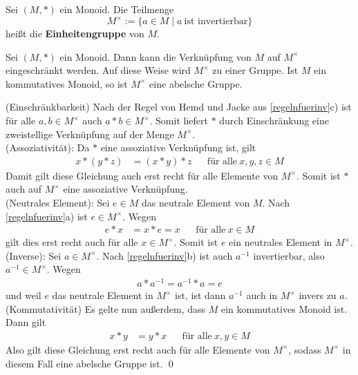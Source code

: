 \begin{de} 
    Sei $(M,*)$ ein Monoid. Die Teilmenge
        \[ M^\times := \{a\in M\mid a\ \text{ist invertierbar} \} \]
    heißt die \textbf{Einheitengruppe} von $M$.
\end{de}


\begin{satz} \label{einheitengruppe}
    Sei $(M,*)$ ein Monoid. Dann kann die Verknüpfung von $M$ auf $M^\times$ eingeschränkt werden. Auf diese Weise wird $M^\times$ zu einer Gruppe. Ist $M$ ein kommutatives Monoid, so ist $M^\times$ eine abelsche Gruppe.
\end{satz}


\begin{bew}
    (Einschränkbarkeit) Nach der Regel von Hemd und Jacke aus \cref{regelnfuerinv}c) ist für alle $a,b\in M^\times$ auch $a*b\in M^\times$. Somit liefert $*$ durch Einschränkung eine zweistellige Verknüpfung auf der Menge $M^\times$. \\[0.5em]
    (Assoziativität): Da $*$ eine assoziative Verknüpfung ist, gilt
    \begin{align*}
        x*(y*z) & = (x*y)*z && \text{für alle}\ x,y,z\in M
    \end{align*}
    Damit gilt diese Gleichung auch erst recht für alle Elemente von $M^\times$. Somit ist $*$ auch auf $M^\times$ eine assoziative Verknüpfung. \\[0.5em]
    (Neutrales Element): Sei $e\in M$ das neutrale Element von $M$. Nach \cref{regelnfuerinv}a) ist $e\in M^\times$. Wegen
    \begin{align*}
        e*x& =x*e=x && \text{für alle}\ x\in M
    \end{align*}
    gilt dies erst recht auch für alle $x\in M^\times$. Somit ist $e$ ein neutrales Element in $M^\times$. \\[0.5em]
    (Inverse): Sei $a\in M^\times$. Nach \cref{regelnfuerinv}b) ist auch $a^{-1}$ invertierbar, also $a^{-1}\in M^\times$. Wegen
    \begin{align*}
        a*a^{-1}=a^{-1}*a=e
    \end{align*}
    und weil $e$ das neutrale Element in $M^\times$ ist, ist dann $a^{-1}$ auch in $M^\times$ invers zu $a$. \\[0.5em]
    (Kommutativität) Es gelte nun außerdem, dass $M$ ein kommutatives Monoid ist. Dann gilt
    \begin{align*}
        x*y & = y*x && \text{für alle}\ x,y\in M
    \end{align*}
    Also gilt diese Gleichung erst recht auch für alle Elemente von $M^\times$, sodass $M^\times$ in diesem Fall eine abelsche Gruppe ist. \qed
\end{bew}


